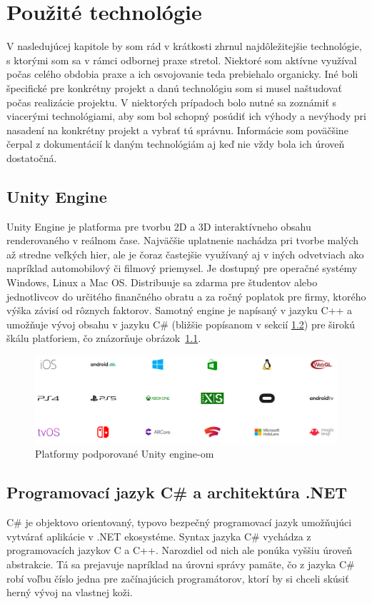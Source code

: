 \documentclass[slovak,bachelorpractice]{diploma}
\begin{document}
\chapter{Použité technológie}
\label{sec:Tech}
V nasledujúcej kapitole by som rád v krátkosti zhrnul najdôležitejšie technológie, s ktorými som sa v rámci odbornej praxe stretol. Niektoré som aktívne využíval počas celého obdobia praxe a ich osvojovanie teda prebiehalo organicky. Iné boli špecifické pre konkrétny projekt a danú technológiu som si musel naštudovať počas realizácie projektu. V niektorých prípadoch bolo nutné sa zoznámiť s viacerými technológiami, aby som bol schopný posúdiť ich výhody a nevýhody pri nasadení na konkrétny projekt a vybrať tú správnu. Informácie som poväčšine čerpal z dokumentácií k daným technológiám aj keď nie vždy bola ich úroveň dostatočná.
\section{Unity Engine}
\label{sec:Unity}
Unity Engine \cite{Unity} je platforma pre tvorbu 2D a 3D interaktívneho obsahu renderovaného v reálnom čase. Najväčšie uplatnenie nachádza pri tvorbe malých až stredne veľkých hier, ale je čoraz častejšie využívaný aj v iných odvetviach ako napríklad automobilový či filmový priemysel. Je dostupný pre operačné systémy Windows, Linux a Mac OS. Distribuuje sa zdarma pre študentov alebo jednotlivcov do určitého finančného obratu a za ročný poplatok pre firmy, ktorého výška závisí od rôznych faktorov. Samotný engine je napísaný v jazyku C++ a umožňuje vývoj obsahu v jazyku C\# (bližšie popísanom v sekcií \ref{sec:CsharpDotNet}) pre širokú škálu platforiem, čo znázorňuje \mbox{obrázok \ref{pic:UnityPlatforms}}.

\begin{figure}[!htbp]
	\centering
	\includegraphics[width=1\textwidth]{Pictures/platforms.png}
	\caption{Platformy podporované Unity engine-om \cite{UnityMultiplatform}}
	\label{pic:UnityPlatforms}
\end{figure}

\section{Programovací jazyk C\# a architektúra .NET}
\label{sec:CsharpDotNet}
C\# \cite{CSharpLang} je objektovo orientovaný, typovo bezpečný programovací jazyk umožňujúci vytvárať aplikácie v .NET ekosystéme. Syntax jazyka C\# vychádza z programovacích jazykov C a C++. Narozdiel od nich ale ponúka vyššiu úroveň abstrakcie. Tá sa prejavuje napríklad na úrovni správy pamäte, čo z jazyka C\# robí voľbu číslo jedna pre začínajúcich programátorov, ktorí by si chceli skúsiť herný vývoj na vlastnej koži.
\end{document}
